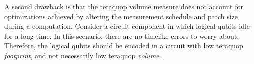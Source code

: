 A second drawback is that the teraquop volume measure does not account for optimizations achieved by altering the measurement schedule and patch size during a computation.
Consider a circuit component in which logical qubits idle for a long time. In this scenario, there are no timelike errors to worry about.
Therefore, the logical qubits should be encoded in a circuit with low teraquop \emph{footprint}, and not necessarily low teraquop \emph{volume}.
